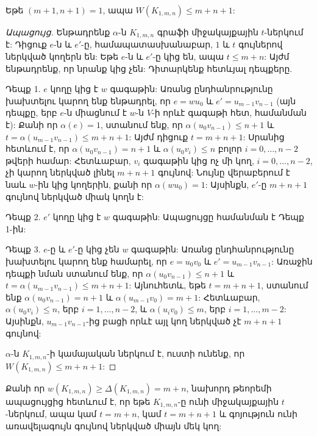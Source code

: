 \begin{hide}
\begin{theorem}
\label{upperBound}
Եթե $(m+1,n+1)=1$, ապա $W(K_{1,m,n}) \leq m+n+1$:
\end{theorem}
\begin{proof}[Ապացույց]
Ենթադրենք $\alpha$-ն $K_{1,m,n}$ գրաֆի միջակայքային $t$-ներկում է: Դիցուք $e$-ն և $e'$-ը, համապատասխանաբար, $1$ և $t$ գույներով ներկված կողերն են: Եթե $e$-ն և $e'$-ը կից են, ապա $t \leq m+n$: Այժմ ենթադրենք, որ նրանք կից չեն: Դիտարկենք հետևյալ դեպքերը.
\begin{description}
\item{Դեպք 1.} $e$ կողը կից է $w$ գագաթին: Առանց ընդհանրությունը խախտելու կարող ենք ենթադրել, որ $e=wu_0$ և $e'=u_{m-1}v_{n-1}$ (այն դեպքը, երբ $e$-ն միացնում է $w$-ն $V$-ի որևէ գագաթի հետ, համանման է): Քանի որ $\alpha(e)=1$, ստանում ենք, որ $\alpha(u_0v_{n-1}) \leq n+1$ և $t=\alpha(u_{m-1}v_{n-1}) \leq m+n+1$: Այժմ դիցուք $t=m+n+1$: Սրանից հետևում է, որ $\alpha(u_0v_{n-1})=n+1$ և $\alpha(u_0v_i)\leq n$ բոլոր $i=0,\ldots,n-2$ թվերի համար: Հետևաբար, $v_i$ գագաթին կից ոչ մի կող, $i=0,\ldots,n-2$, չի կարող ներկված լինել $m+n+1$ գույնով: Նույնը վերաբերում է նաև $w$-ին կից կողերին, քանի որ $\alpha(wu_0)=1$: Այսինքն, $e'$-ը $m+n+1$ գույնով ներկված միակ կողն է:
\item{Դեպք 2.} $e'$ կողը կից է $w$ գագաթին: Ապացույցը համանման է Դեպք 1-ին:
\item{Դեպք 3.} $e$-ը և $e'$-ը կից չեն $w$ գագաթին: Առանց ընդհանրությունը խախտելու կարող ենք համարել, որ $e=u_0v_0$ և $e'=u_{m-1}v_{n-1}$: Առաջին դեպքի նման ստանում ենք, որ $\alpha(u_0v_{n-1}) \leq n+1$ և $t=\alpha(u_{m-1}v_{n-1}) \leq m+n+1$: Այնուհետև, եթե $t=m+n+1$, ստանում ենք $\alpha(u_0v_{n-1})=n+1$ և $\alpha(u_{m-1}v_0)=m+1$: Հետևաբար, $\alpha(u_0v_i)\leq n$, երբ $i=1,\ldots,n-2$, և $\alpha(u_iv_0) \leq m$, երբ $i=1,\ldots,m-2$: Այսինքն, $u_{m-1}v_{n-1}$-ից բացի որևէ այլ կող ներկված չէ $m+n+1$ գույնով: 
\end{description}
$\alpha$-ն $K_{1,m,n}$-ի կամայական ներկում է, ուստի ունենք, որ $W(K_{1,m,n}) \leq m+n+1$:
\end{proof}

\begin{remark}
\label{uniqueMaximum}
Քանի որ $w(K_{1,m,n}) \geq \Delta(K_{1,m,n}) = m+n$, նախորդ թեորեմի ապացույցից հետևում է, որ եթե $K_{1,m,n}$-ը ունի միջակայքային $t$-ներկում, ապա կամ $t=m+n$, կամ $t=m+n+1$ և գոյություն ունի առավելագույն գույնով ներկված միայն մեկ կող:
\end{remark}


\end{hide}
